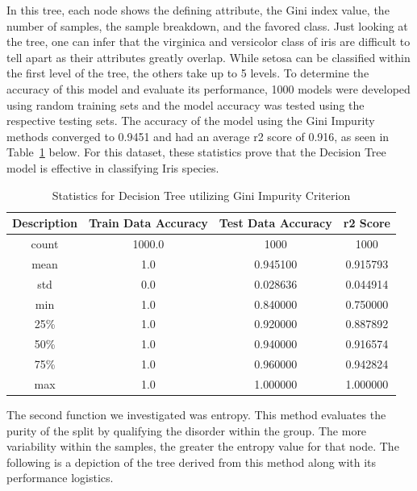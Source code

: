\documentclass[journal]{IEEEtran}
\begin{document}
In this tree, each node shows the defining attribute, the Gini index value, the number of samples, the sample breakdown, and the favored class. Just looking at the tree, one can infer that the virginica and versicolor class of iris are difficult to tell apart as their attributes greatly overlap. While setosa can be classified within the first level of the tree, the others take up to 5 levels. To determine the accuracy of this model and evaluate its performance, 1000 models were developed using random training sets and the model accuracy was tested using the respective testing sets. The accuracy of the model using the Gini Impurity methods converged to 0.9451 and had an average r2 score of 0.916, as seen in Table~\ref{table:dtGI} below. For this dataset, these statistics prove that the Decision Tree model is effective in classifying Iris species. 

\begin{table}[h!]
\centering
\begin{tabular}{ c | c c c }
    Description & Train Data Accuracy & Test Data Accuracy & r2 Score \\ 
\hline
count & 1000.0    & 1000 & 1000  \\
mean  &    1.0    &    0.945100   &  0.915793 \\
std   &    0.0    &    0.028636   &  0.044914 \\
min   &    1.0    &    0.840000   &  0.750000 \\
25\%  &     1.0   &     0.920000  &   0.887892 \\
50\%  &     1.0   &     0.940000  &   0.916574 \\
75\%  &     1.0   &     0.960000  &   0.942824 \\
max   &   1.0     &   1.000000    & 1.000000
\end{tabular}
\caption{Statistics for Decision Tree utilizing Gini Impurity Criterion}
\label{table:dtGI}
\end{table}

The second function we investigated was entropy. This method evaluates the purity of the split by qualifying the disorder within the group. The more variability within the samples, the greater the entropy value for that node. The following is a depiction of the tree derived from this method along with its performance logistics. 
\end{document}
